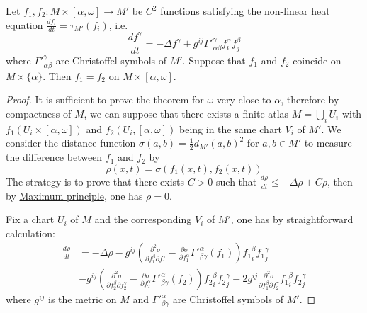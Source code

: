 \begin{theorem}
\label{thm:unique-nonlinear-heat}
Let \(f_1,f_2: M\times [\alpha,\omega] \longrightarrow M'\) be \(C^2\)
functions satisfying the non-linear heat equation
\(\frac{d f_i}{d t} = \tau_{M'}(f_i)\), i.e.
\[
 \frac{d f^\gamma}{d t} =-\Delta f^\gamma +g^{ij}\Gamma'^{\gamma}_{\alpha\beta} f^{\alpha}_{i}f^{\beta}_{j}
\]
where \(\Gamma'^\gamma_{\alpha\beta}\) are Christoffel symbols of \(M'\). Suppose that
\(f_1\) and \(f_2\) coincide on \(M\times \{\alpha\}\). Then \(f_1=f_2\) on \(M\times[\alpha,\omega]\).
\end{theorem}

\begin{proof}
It is sufficient to prove the theorem for \(\omega\) very close to \(\alpha\),
therefore by compactness of \(M\), we can suppose that there exists a finite atlas \(M
= \bigcup_i U_i\) with \(f_1 (U_i\times [\alpha,\omega])\) and \(f_2
(U_i,[\alpha,\omega])\) being in the same chart \(V_i\) of \(M'\). We consider the
distance function \(\sigma(a,b) = \frac{1}{2}d_{M'}(a,b)^2\) for \(a,b\in M'\) to
measure the difference between \(f_1\) and \(f_2\) by 
\[
 \rho(x,t) = \sigma(f_1(x,t), f_2(x,t))
\]
The strategy is to prove that there exists \(C>0\) such that \(\frac{d \rho}{d t} \leq
-\Delta \rho + C\rho\), then by \href{elliptic-parabolic.org}{Maximum principle}, one has \(\rho = 0\).

Fix a chart \(U_i\) of \(M\) and the corresponding \(V_i\) of \(M'\), one has by
straightforward calculation:
\begin{align}
 \frac{d\rho}{d t} &= -\Delta \rho -g^{ij}\left( \frac{\partial^2 \sigma}{\partial
 f_1^\beta \partial f_1^\gamma} - \frac{\partial \sigma}{\partial f_1^\alpha} {\Gamma'}
^{\alpha}_{\beta\gamma}(f_1) \right) {f_1}^\beta_i {f_1}^\gamma_j \nonumber \\
	        &- g^{ij}\left( \frac{\partial^2 \sigma}{\partial
 f_2^\beta \partial f_2^\gamma} - \frac{\partial \sigma}{\partial f_2^\alpha} {\Gamma'}
^{\alpha}_{\beta\gamma}(f_2) \right) {f_2}^\beta_i {f_2}^\gamma_j - 2g^{ij}\frac{\partial^2 \sigma}{\partial f_1^\beta \partial f_2^\gamma} {f_1}^\beta_i {f_2}^\gamma_j  \label{eq:drho-dt}
\end{align}
where \(g^{ij}\) is the metric on \(M\) and \({\Gamma'}^\alpha_{\beta\gamma}\) are
Christoffel symbols of \(M'\). 



\end{proof}
